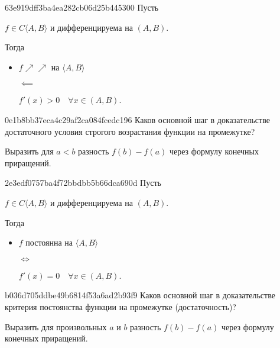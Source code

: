 \begin{note}{63e919dff3ba4ea282cb06d25b445300}
    Пусть \begin{icloze}{4}\( f \in C\langle A, B \rangle  \) и дифференцируема на \( (A, B) \).\end{icloze} Тогда
    \begin{itemize}
        \item {}\begin{icloze}{2}\( f \!\nearrow\!\!\nearrow \) на \( \langle A, B \rangle  \)\end{icloze}
            \begin{icloze}{3}\( \impliedby  \)\end{icloze}
            \begin{icloze}{1}\( f'(x) > 0 \quad \forall x \in (A, B) \).\end{icloze}
    \end{itemize}
\end{note}

\begin{note}{0e1b8bb37eca4c29af2ca084fcedc196}
    Каков основной шаг в доказательстве достаточного условия строгого возрастания функции на промежутке?

    \begin{cloze}{1}
        Выразить для \( a < b \) разность \( f(b) - f(a) \) через формулу конечных приращений.
    \end{cloze}
\end{note}

\begin{note}{2e3edf0757ba4f72bbdbb5b66dca690d}
    Пусть \begin{icloze}{4}\( f \in C\langle A, B \rangle  \) и дифференцируема на \( (A, B) \).\end{icloze} Тогда
    \begin{itemize}
        \item {}\begin{icloze}{2}\( f \) постоянна на \( \langle A, B \rangle  \)\end{icloze}
            \begin{icloze}{3}\( \iff  \)\end{icloze}
            \begin{icloze}{1}\( f'(x) = 0 \quad \forall x \in (A, B) \).\end{icloze}
    \end{itemize}
\end{note}

\begin{note}{b036d705ddbe49b6814f53a6ad2b93f9}
    Каков основной шаг в доказательстве критерия постоянства функции на промежутке (достаточность)?

    \begin{cloze}{1}
        Выразить для произвольных \( a \) и \( b \) разность \( f(b) - f(a) \) через формулу конечных приращений.
    \end{cloze}
\end{note}

